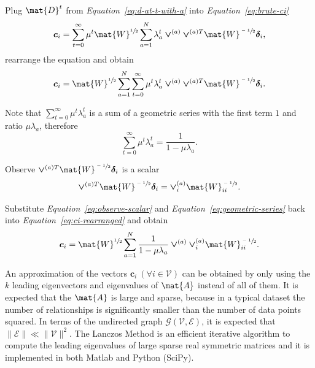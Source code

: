 \documentclass[12pt]{report}
\begin{document}
%
%


Plug $\mat{D}^t$ from \emph{Equation~\ref{eq:d-at-t-with-a}} into
\emph{Equation~\ref{eq:brute-ci}}
\begin{equation}
  \bm{c}_i = \sum_{t=0}^\infty \mu^t \mat{W}^{\sfrac{1}{2}} \sum_{a=1}^{N}
    \lambda_a^t \bm{\vee}^{(a)} \bm{\vee}^{(a)T} \mat{W}^{\sfrac{-1}{2}}
    \bm{\delta}_i,
\end{equation}
rearrange the equation and obtain
\begin{equation}
  \label{eq:ci-rearranged}
  \bm{c}_i = \mat{W}^{\sfrac{1}{2}} \sum_{a=1}^{N} \sum_{t=0}^\infty \mu^t
    \lambda_a^t \bm{\vee}^{(a)} \bm{\vee}^{(a)T} \mat{W}^{\sfrac{-1}{2}}
    \bm{\delta}_i.
\end{equation}


%
%


Note that $\sum_{t=0}^\infty \mu^t\lambda_a^t$ is a sum of a geometric series
with the first term $1$ and ratio $\mu \lambda_a$, therefore
\begin{equation}
  \label{eq:geometric-series}
  \sum_{t=0}^\infty \mu^t\lambda_a^t = \frac{1}{1 - \mu \lambda_a}.
\end{equation}


Observe $\bm{\vee}^{(a)T} \mat{W}^{\sfrac{-1}{2}} \bm{\delta}_i$ is a scalar
\begin{equation}
  \label{eq:observe-scalar}
  \bm{\vee}^{(a)T} \mat{W}^{\sfrac{-1}{2}} \bm{\delta}_i =
    \bm{\vee}^{(a)}_i \mat{W}^{\sfrac{-1}{2}}_{ii}.
\end{equation}


Substitute \emph{Equation~\ref{eq:observe-scalar}} and \emph{Equation~\ref{eq:geometric-series}}
back into \emph{Equation~\ref{eq:ci-rearranged}} and obtain
\begin{equation}
  \label{eq:ci-rearranged-geometric}
  \bm{c}_i = \mat{W}^{\sfrac{1}{2}} \sum_{a=1}^{N} \frac{1}{1 - \mu \lambda_a}
    \bm{\vee}^{(a)} \bm{\vee}^{(a)}_i \mat{W}^{\sfrac{-1}{2}}_{ii}.
\end{equation}


%
%


An approximation of the vectors $\bm{c}_i \ (\forall i \in \mathcal{V})$ can be
obtained by only using the $k$ leading eigenvectors and eigenvalues of $\mat{A}$
instead of all of them. It is expected that the $\mat{A}$ is large and sparse,
because in a typical dataset the number of relationships is significantly
smaller than the number of data points squared. In terms of the undirected graph
$\mathcal{G}(\mathcal{V}, \mathcal{E})$, it is expected that $\|\mathcal{E}\|
\ll \|\mathcal{V}\|^2$. The Lanczos Method is an efficient iterative algorithm
to compute the leading eigenvalues of large sparse real symmetric matrices
\cite{calvetti1994implicitly} and it is implemented in both Matlab and Python
(SciPy).
\end{document}
